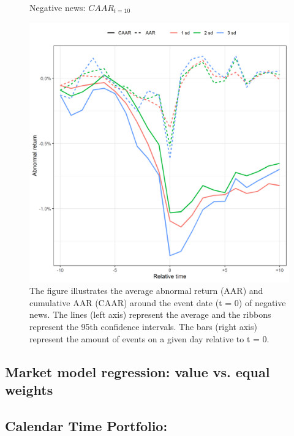 \begin{figure} [H]
    \centering
    \caption{Negative news: $CAAR_{t=10}$}
    \includegraphics[scale=0.6]{Projekt/1.Figures analysis/ST_negative_sensitivity.png}
     \caption*{\footnotesize The figure illustrates the average abnormal return (AAR) and cumulative AAR (CAAR) around the event date (t = 0) of negative news. The lines (left axis) represent the average and the ribbons represent the 95th confidence intervals. The bars (right axis) represent the amount of events on a given day relative to t = 0. }
    \label{fig:ST_neg_sensitivity}
\end{figure} 


\subsection{Market model regression: value vs. equal weights}



\subsection{Calendar Time Portfolio: }